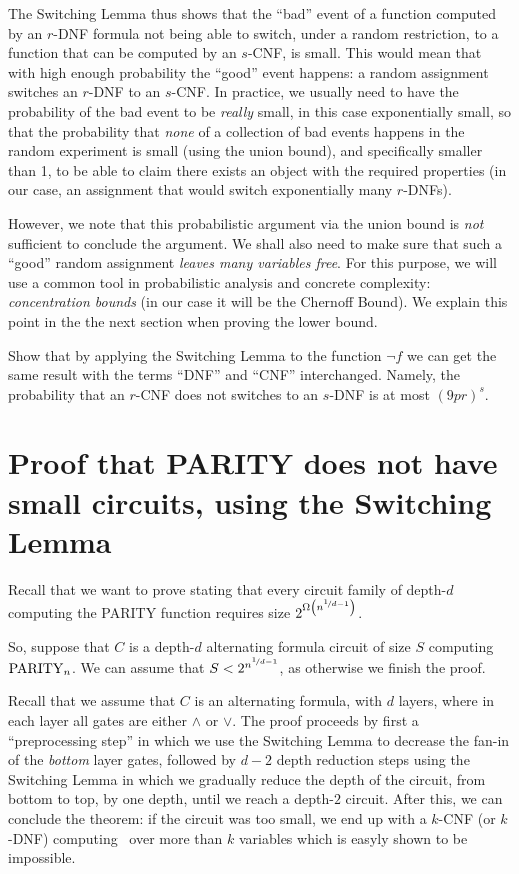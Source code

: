 The Switching Lemma thus shows that the ``bad'' event of a function computed by an $r$-DNF formula not being able to switch, under  a random restriction,  to a function that can be computed by an $s$-CNF, is small. This would mean that with high enough probability the ``good'' event happens: a random assignment switches an $r$-DNF to an $s$-CNF.
In practice, we usually need to have the probability of the bad event to be \emph{really} small, in this case  exponentially small, so that the probability that \emph{none} of a collection of bad events happens in the random experiment is small (using the union bound), and specifically smaller than 1, to be able to claim there exists an object with the required properties (in our case, an assignment that would switch exponentially many $r$-DNFs).  

However, we note that this probabilistic argument via the union bound  is  \emph{not} sufficient to conclude the argument. We shall also need to make sure that such a ``good'' random assignment  \emph{leaves many variables free}. For this purpose, we will use a common tool in probabilistic analysis and concrete complexity: \emph{concentration bounds} (in our case it will be the Chernoff Bound). We  explain this point in the the next section when proving the lower bound.


\begin{exercise} Show that by applying the Switching Lemma to the function $\neg f$ we can get the same result with the terms ``DNF'' and ``CNF'' interchanged. Namely, the probability that an $r$-CNF does not switches to an $s$-DNF is at most $(9pr)^s$.
\end{exercise}

\section{Proof that PARITY does not have small circuits, using the Switching Lemma}

Recall that we want to prove   stating that every circuit family of depth-$d$ computing the PARITY function requires size $2^{\Omega\left(n^{\nicefrac{1}{d-1}}\right)}$.

So, suppose  that $C$ is a depth-$d$ alternating formula circuit of size $S$ computing $\operatorname{PARITY}_n$. We can assume that 
$S< 2^{ n^{\nicefrac{1}{d-1}}}$, as otherwise we finish the proof.


Recall that we assume that $C$ is an alternating formula, with $d$ layers, where in each layer all gates are either $\land$ or $\lor$.  The proof proceeds by first a ``preprocessing step'' in which we use the Switching Lemma to decrease the fan-in of the \emph{bottom} layer gates, followed by   $d-2$ depth reduction steps using the Switching Lemma in which we gradually reduce the depth of the circuit, from bottom to top, by one depth, until we reach a depth-$2$ circuit.
After this, we can conclude the theorem: if the circuit was too small, we end up with a $k$-CNF (or $k$-DNF) computing \Parity\ over more than $k$ variables which is easyly shown to be impossible.




